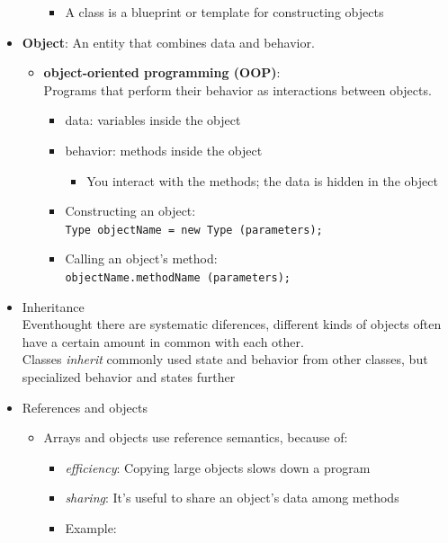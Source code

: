 \documentclass[a4paper]{article}
\newcommand{\inline}[1]{\lstinline!#1!}%
\begin{document}
\begin{itemize}
\begin{itemize}
\begin{itemize}
            \item A class is a blueprint or template for constructing objects
          \end{itemize}
      \end{itemize}
     \item \textbf{Object}: An entity that combines data and behavior.
     	\begin{itemize}
     		\item \textbf{object-oriented programming (OOP)}:\\Programs that perform their behavior as interactions between objects.
     			\begin{itemize}
     				\item data: variables inside the object
     				\item behavior: methods inside the object 
     					\begin{itemize}
     						\item You interact with the methods; the data is hidden in the object
     					\end{itemize}
     				\item Constructing an object:\\\inline{Type objectName = new Type (parameters);}
     				\item Calling an object's method:\\ \inline{objectName.methodName (parameters);}
     			\end{itemize}
     	\end{itemize}
     	\item Inheritance\\
     	Eventhought there are systematic diferences, different kinds of objects often have a certain amount in common with each other.\\ Classes \textit{inherit} commonly used state and behavior from other classes, but specialized behavior and states further 
\item References and objects
	\begin{itemize}
		\item Arrays and objects use reference semantics, because of:
			\begin{itemize}
				\item \textit{efficiency}: Copying large objects slows down a program
				\item \textit{sharing}: It's useful to share an object's data among methods
				\item Example:
					\begin{lstlisting}

\end{lstlisting}
\end{itemize}
\end{itemize}
\end{itemize}
\end{document}
